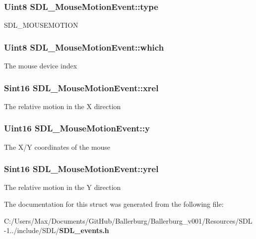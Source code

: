 \subsubsection[{type}]{\setlength{\rightskip}{0pt plus 5cm}Uint8 S\+D\+L\+\_\+\+Mouse\+Motion\+Event\+::type}\label{struct_s_d_l___mouse_motion_event_ab5d4d8bef3b1a6f34429024b7aecf682}
S\+D\+L\+\_\+\+M\+O\+U\+S\+E\+M\+O\+T\+I\+O\+N 
\subsubsection[{which}]{\setlength{\rightskip}{0pt plus 5cm}Uint8 S\+D\+L\+\_\+\+Mouse\+Motion\+Event\+::which}\label{struct_s_d_l___mouse_motion_event_a7ea0004baf91d3b4572cdaadd35474c5}
The mouse device index 
\subsubsection[{xrel}]{\setlength{\rightskip}{0pt plus 5cm}Sint16 S\+D\+L\+\_\+\+Mouse\+Motion\+Event\+::xrel}\label{struct_s_d_l___mouse_motion_event_a84d307cc7d52073852497d8846f0a7c5}
The relative motion in the X direction 
\subsubsection[{y}]{\setlength{\rightskip}{0pt plus 5cm}Uint16 S\+D\+L\+\_\+\+Mouse\+Motion\+Event\+::y}\label{struct_s_d_l___mouse_motion_event_ac7d0f0463c27e6d8e154efe5cc6c1897}
The X/\+Y coordinates of the mouse 
\subsubsection[{yrel}]{\setlength{\rightskip}{0pt plus 5cm}Sint16 S\+D\+L\+\_\+\+Mouse\+Motion\+Event\+::yrel}\label{struct_s_d_l___mouse_motion_event_a371e2cd4087a507663e512436fb4009b}
The relative motion in the Y direction 

The documentation for this struct was generated from the following file\+:\begin{DoxyCompactItemize}
\item 
C\+:/\+Users/\+Max/\+Documents/\+Git\+Hub/\+Ballerburg/\+Ballerburg\+\_\+v001/\+Resources/\+S\+D\+L-\/1../include/\+S\+D\+L/{\bf S\+D\+L\+\_\+events.\+h}\end{DoxyCompactItemize}
